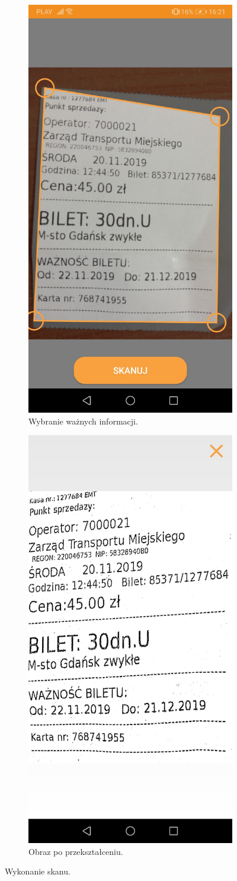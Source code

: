 \documentclass[10pt,twoside,a4paper]{report}
\begin{document}
\begin{figure}[h]
\begin{subfigure}{0.5\textwidth}
\includegraphics[width=0.9\linewidth, width=5cm]{chooseScan}
\caption{Wybranie ważnych informacji.}
\label{fig:chooseScan}
\end{subfigure}
\begin{subfigure}{0.5\textwidth}
\centering
\includegraphics[width=0.9\linewidth, width=5cm]{scan}
\caption{Obraz po przekształceniu.}
\label{fig:scan}
\end{subfigure}
\caption{Wykonanie skanu.}
\label{fig:podrecznik8}
\end{figure}
\FloatBarrier
\end{document}

